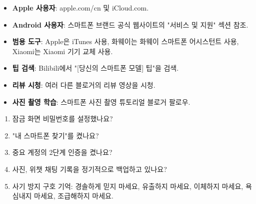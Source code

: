 

\begin{itemize}
  \item \textbf{Apple 사용자}: apple.com/cn 및 iCloud.com.
  \item \textbf{Android 사용자}: 스마트폰 브랜드 공식 웹사이트의 "서비스 및 지원" 섹션 참조.
  \item \textbf{범용 도구}: Apple은 iTunes 사용, 화웨이는 화웨이 스마트폰 어시스턴트 사용, Xiaomi는 Xiaomi 기기 교체 사용.
\end{itemize}


\begin{itemize}
  \item \textbf{팁 검색}: Bilibili에서 "[당신의 스마트폰 모델] 팁"을 검색.
  \item \textbf{리뷰 시청}: 여러 다른 블로거의 리뷰 영상을 시청.
  \item \textbf{사진 촬영 학습}: 스마트폰 사진 촬영 튜토리얼 블로거 팔로우.
\end{itemize}


\begin{enumerate}
  \item 잠금 화면 비밀번호를 설정했나요?
  \item "내 스마트폰 찾기"를 켰나요?
  \item 중요 계정의 2단계 인증을 켰나요?
  \item 사진, 위챗 채팅 기록을 정기적으로 백업하고 있나요?
  \item 사기 방지 구호 기억: 경솔하게 믿지 마세요, 유출하지 마세요, 이체하지 마세요, 욕심내지 마세요, 조급해하지 마세요.
\end{enumerate}
